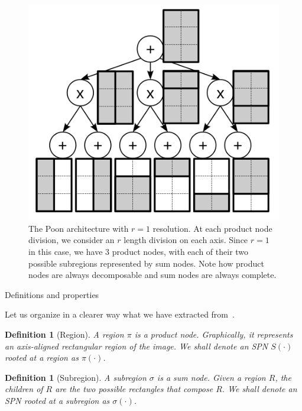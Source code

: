 \documentclass{amsart}
\makeatletter
\def\subsection{\@startsection{subsection}{3}%
  \z@{.5\linespacing\@plus.7\linespacing}{.1\linespacing}%
  {\normalfont}}
\theoremstyle{plain}
\newcounter{dummy-def}\numberwithin{dummy-def}{section}
\newtheorem{definition}[dummy-def]{Definition}
\newcounter{dummy-thm}\numberwithin{dummy-thm}{section}
\newcounter{dummy-prop}\numberwithin{dummy-prop}{section}
\newcounter{dummy-corollary}\numberwithin{dummy-corollary}{section}
\newcounter{dummy-lemma}\numberwithin{dummy-lemma}{section}
\newcounter{dummy-ex}\numberwithin{dummy-ex}{section}
\newcounter{dummy-eg}\numberwithin{dummy-eg}{section}
\numberwithin{equation}{section}
\makeatother
\begin{document}
\begin{figure}[h]
  \centering
  \includegraphics[scale=1.0]{dv_spn.png}
  \captionsetup{justification=raggedright}
  \caption{The Poon architecture with $r = 1$ resolution. At each product node division, we
  consider an $r$ length division on each axis. Since $r=1$ in this case, we have $3$ product
  nodes, with each of their two possible subregions represented by sum nodes. Note how product
  nodes are always decomposable and sum nodes are always complete.\label{fig:dv_spn}}
\end{figure}

\subsection{Definitions and properties}

Let us organize in a clearer way what we have extracted from~\cite{clustering}.

\begin{definition}[Region] A region $\pi$ is a product node. Graphically, it represents an
  axis-aligned rectangular region of the image. We shall denote an SPN $S(\cdot)$ rooted at a
  region as $\pi(\cdot)$.
\end{definition}

\begin{definition}[Subregion] A subregion $\sigma$ is a sum node. Given a region $R$, the children
  of $R$ are the two possible rectangles that compose $R$. We shall denote an SPN rooted at a
  subregion as $\sigma(\cdot)$.
\end{definition}
\end{document}
